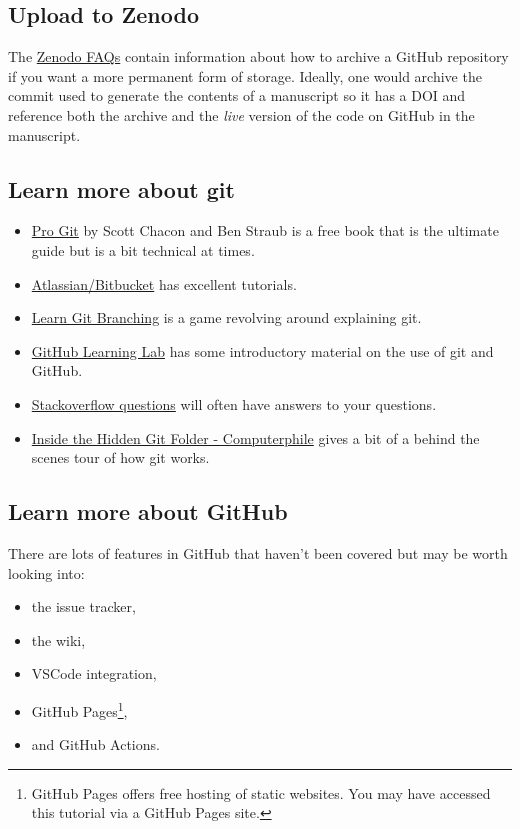 \documentclass[11pt,onecolumn]{scrartcl}
\begin{document}
\subsection{Upload to Zenodo}
\label{sec:orga9661d3}

The \href{https://help.zenodo.org/}{Zenodo FAQs} contain information about how to archive a GitHub repository if
you want a more permanent form of storage. Ideally, one would archive the commit
used to generate the contents of a manuscript so it has a DOI and reference both
the archive and the \emph{live} version of the code on GitHub in the manuscript.

\subsection{Learn more about git}
\label{sec:org58700ce}

\begin{itemize}
\item \href{https://git-scm.com/book/en/v2}{Pro Git} by Scott Chacon and Ben Straub is a free book that is the ultimate
guide but is a bit technical at times.
\item \href{https://www.atlassian.com/git/tutorials}{Atlassian/Bitbucket} has excellent tutorials.
\item \href{https://learngitbranching.js.org/}{Learn Git Branching} is a game revolving around explaining git.
\item \href{https://lab.github.com/}{GitHub Learning Lab} has some introductory material on the use of git and
GitHub.
\item \href{https://stackoverflow.com/questions/tagged/git}{Stackoverflow questions} will often have answers to your questions.
\item \href{https://youtu.be/bSA91XTzeuA}{Inside the Hidden Git Folder - Computerphile} gives a bit of a behind the
scenes tour of how git works.
\end{itemize}

\subsection{Learn more about GitHub}
\label{sec:orgc5455d7}

There are lots of features in GitHub that haven't been covered but may be worth
looking into:

\begin{itemize}
\item the issue tracker,
\item the wiki,
\item VSCode integration,
\item GitHub Pages\footnote{GitHub Pages offers free hosting of static websites. You may have accessed this tutorial via a GitHub Pages site.},
\item and GitHub Actions.
\end{itemize}
\end{document}

